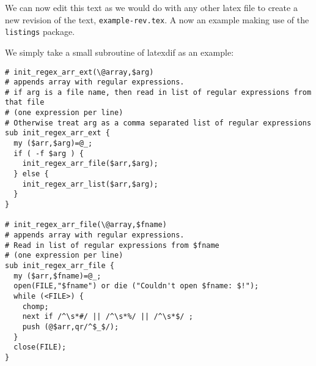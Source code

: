 \documentclass{article}
\begin{document}
We can now edit
this text as we would do with any other latex file to create
a new revision of the text, \verb|example-rev.tex|.
\newpage
A now an example making use of the \lstinline|listings| package.

We simply take a small subroutine of latexdif as an example:
\lstset{language=perl}
\begin{lstlisting}[commentstyle=\color{gray}]
# init_regex_arr_ext(\@array,$arg)
# appends array with regular expressions.
# if arg is a file name, then read in list of regular expressions from that file
# (one expression per line)
# Otherwise treat arg as a comma separated list of regular expressions
sub init_regex_arr_ext {
  my ($arr,$arg)=@_;
  if ( -f $arg ) {
    init_regex_arr_file($arr,$arg);
  } else {
    init_regex_arr_list($arr,$arg);
  }
}

# init_regex_arr_file(\@array,$fname)
# appends array with regular expressions.
# Read in list of regular expressions from $fname
# (one expression per line)
sub init_regex_arr_file {
  my ($arr,$fname)=@_;
  open(FILE,"$fname") or die ("Couldn't open $fname: $!");
  while (<FILE>) {
    chomp;
    next if /^\s*#/ || /^\s*%/ || /^\s*$/ ;
    push (@$arr,qr/^$_$/);
  }
  close(FILE);
}
\end{lstlisting}
\end{document}
